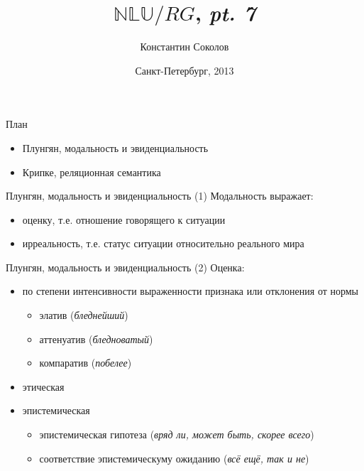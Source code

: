 \documentclass{beamer}
\begin{document}
\title{\huge{$\mathbb{NLU}/RG$, \textit{pt. 7}}}
\author{Константин Соколов}
\date{Санкт-Петербург, 2013} 
\begin{frame}
    \thispagestyle{empty}
    \titlepage
\end{frame}

\begin{frame}{План}
    \setcounter{framenumber}{1}
    \begin{itemize}
        \item Плунгян, модальность и эвиденциальность
        \item Крипке, реляционная семантика
    \end{itemize}
\end{frame}

\begin{frame}{Плунгян, модальность и эвиденциальность (1)}
Модальность выражает:\\
\bigskip 
\begin{itemize}
  \item оценку, т.е. отношение говорящего к ситуации
  \item ирреальность, т.е. статус ситуации относительно реального мира
\end{itemize}
\end{frame}

\begin{frame}{Плунгян, модальность и эвиденциальность (2)}
Оценка:\\
\bigskip
\begin{itemize}
  \item по степени интенсивности выраженности признака или отклонения от нормы
    \begin{itemize}
      \item элатив (\textit{бледнейший})
      \item аттенуатив (\textit{бледноватый})
      \item компаратив (\textit{побелее})
    \end{itemize}
  \item этическая
  \item эпистемическая 
    \begin{itemize}
      \item эпистемическая гипотеза (\textit{вряд ли, может быть, скорее всего})
      \item соответствие эпистемическуму ожиданию (\textit{всё ещё, так и не})
    \end{itemize}
\end{itemize}
\end{frame}
\end{document}
